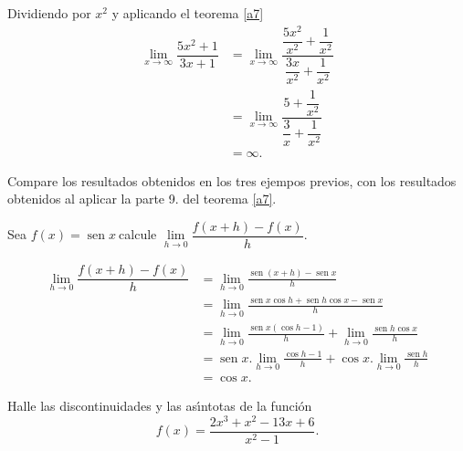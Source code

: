 \begin{sol}
Dividiendo por $x^{2}$ y aplicando el teorema \ref{a7}%
\begin{align*}
\lim\limits_{x\rightarrow\infty}\dfrac{5x^{2}+1}{3x+1}  &  =\lim
\limits_{x\rightarrow\infty}\dfrac{\dfrac{5x^{2}}{x^{2}}+\dfrac{1}{x^{2}}%
}{\dfrac{3x}{x^{2}}+\dfrac{1}{x^{2}}}\\
&  =\lim\limits_{x\rightarrow\infty}\dfrac{5+\dfrac{1}{x^{2}}}{\dfrac{3}%
{x}+\dfrac{1}{x^{2}}}\\
&  =\infty.
\end{align*}

\end{sol}

\begin{remark}
Compare los resultados obtenidos en los tres ejempos previos, con los
resultados obtenidos al aplicar la parte 9. del teorema \ref{a7}.
\end{remark}

\begin{example}
Sea $f(x)=\operatorname{sen}x\ $calcule $\lim\limits_{h\rightarrow0}%
\dfrac{f(x+h)-f\left(  x\right)  }{h}.$
\end{example}

\begin{sol}%
\begin{align*}
\lim\limits_{h\rightarrow0}\dfrac{f(x+h)-f\left(  x\right)  }{h}  &
=\lim\limits_{h\rightarrow0}\frac{\operatorname{sen}\left(  x+h\right)
-\operatorname{sen}x}{h}\\
&  =\lim\limits_{h\rightarrow0}\frac{\operatorname{sen}x\cos
h+\operatorname{sen}h\cos x-\operatorname{sen}x}{h}\\
&  =\lim\limits_{h\rightarrow0}\frac{\operatorname{sen}x(\cos h-1)}{h}%
+\lim\limits_{h\rightarrow0}\frac{\operatorname{sen}h\cos x}{h}\\
&  =\operatorname{sen}x.\lim\limits_{h\rightarrow0}\frac{\cos h-1}{h}+\cos
x.\lim\limits_{h\rightarrow0}\frac{\operatorname{sen}h}{h}\\
&  =\cos x.
\end{align*}

\end{sol}

\begin{example}
\label{a8}Halle las discontinuidades y las as\'{\i}ntotas de la funci\'{o}n
\[
f\left(  x\right)  =\dfrac{2x^{3}+x^{2}-13x+6}{x^{2}-1}.
\]

\end{example}

